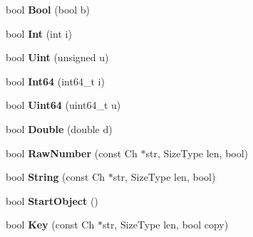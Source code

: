 \begin{DoxyCompactItemize}
\item 
bool {\bfseries Bool} (bool b)\hypertarget{classinternal_1_1_hasher_a11efd784a4e9c4f8a3dc281552df0486}{}\label{classinternal_1_1_hasher_a11efd784a4e9c4f8a3dc281552df0486}

\item 
bool {\bfseries Int} (int i)\hypertarget{classinternal_1_1_hasher_aadbadf98ee7c9ab03a636e0f06d38bac}{}\label{classinternal_1_1_hasher_aadbadf98ee7c9ab03a636e0f06d38bac}

\item 
bool {\bfseries Uint} (unsigned u)\hypertarget{classinternal_1_1_hasher_a4401600c24c817a45cea6c281438e5b4}{}\label{classinternal_1_1_hasher_a4401600c24c817a45cea6c281438e5b4}

\item 
bool {\bfseries Int64} (int64\+\_\+t i)\hypertarget{classinternal_1_1_hasher_ae0579cd54b3c545f77452543793b9a97}{}\label{classinternal_1_1_hasher_ae0579cd54b3c545f77452543793b9a97}

\item 
bool {\bfseries Uint64} (uint64\+\_\+t u)\hypertarget{classinternal_1_1_hasher_a14832ac4ec204f1065b929df2c255457}{}\label{classinternal_1_1_hasher_a14832ac4ec204f1065b929df2c255457}

\item 
bool {\bfseries Double} (double d)\hypertarget{classinternal_1_1_hasher_a83abe847e24ed88d5aab092d840e37c1}{}\label{classinternal_1_1_hasher_a83abe847e24ed88d5aab092d840e37c1}

\item 
bool {\bfseries Raw\+Number} (const Ch $\ast$str, Size\+Type len, bool)\hypertarget{classinternal_1_1_hasher_ae277289ad2fb3a938a6507e566d3c5e2}{}\label{classinternal_1_1_hasher_ae277289ad2fb3a938a6507e566d3c5e2}

\item 
bool {\bfseries String} (const Ch $\ast$str, Size\+Type len, bool)\hypertarget{classinternal_1_1_hasher_a885f2bf42f2bb64d6f9443129dce3883}{}\label{classinternal_1_1_hasher_a885f2bf42f2bb64d6f9443129dce3883}

\item 
bool {\bfseries Start\+Object} ()\hypertarget{classinternal_1_1_hasher_a1607d6cac3daab9725e442e38d121028}{}\label{classinternal_1_1_hasher_a1607d6cac3daab9725e442e38d121028}

\item 
bool {\bfseries Key} (const Ch $\ast$str, Size\+Type len, bool copy)\hypertarget{classinternal_1_1_hasher_a1b34d88f85f9c6a739c1f9038f14f078}{}\label{classinternal_1_1_hasher_a1b34d88f85f9c6a739c1f9038f14f078}


\end{DoxyCompactItemize}
